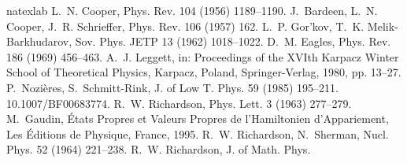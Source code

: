 \documentclass[5p,twocolumn]{elsarticle}
\begin{document}

%
\begin{thebibliography}{16}
\expandafter\ifx\csname natexlab\endcsname\relax\def\natexlab#1{#1}\fi
\providecommand{\bibinfo}[2]{#2}
\ifx\xfnm\relax \def\xfnm[#1]{\unskip,\space#1}\fi
\bibinfo{author}{L.~N. Cooper}, \bibinfo{journal}{Phys. Rev.}
  \bibinfo{volume}{104} (\bibinfo{year}{1956}) \bibinfo{pages}{1189--1190}.
\bibinfo{author}{J.~Bardeen}, \bibinfo{author}{L.~N. Cooper},
  \bibinfo{author}{J.~R. Schrieffer}, \bibinfo{journal}{Phys. Rev.}
  \bibinfo{volume}{106} (\bibinfo{year}{1957}) \bibinfo{pages}{162}.
\bibinfo{author}{L.~P. {Gor'kov}}, \bibinfo{author}{T.~K. Melik-Barkhudarov},
  \bibinfo{journal}{Sov. Phys. JETP} \bibinfo{volume}{13}
  (\bibinfo{year}{1962}) \bibinfo{pages}{1018--1022}.
\bibinfo{author}{D.~M. Eagles}, \bibinfo{journal}{Phys. Rev.}
  \bibinfo{volume}{186} (\bibinfo{year}{1969}) \bibinfo{pages}{456--463}.
\bibinfo{author}{A.~J. Leggett}, in: \bibinfo{booktitle}{Proceedings of the
  XVIth Karpacz Winter School of Theoretical Physics, Karpacz, Poland},
  \bibinfo{publisher}{Springer-Verlag}, \bibinfo{year}{1980}, pp.
  \bibinfo{pages}{13--27}.
\bibinfo{author}{P.~Nozi\`{e}res}, \bibinfo{author}{S.~Schmitt-Rink},
  \bibinfo{journal}{J. of Low T. Phys.} \bibinfo{volume}{59}
  (\bibinfo{year}{1985}) \bibinfo{pages}{195--211}.
  \bibinfo{note}{10.1007/BF00683774}.
\bibinfo{author}{R.~W. Richardson}, \bibinfo{journal}{Phys. Lett.}
  \bibinfo{volume}{3} (\bibinfo{year}{1963}) \bibinfo{pages}{277--279}.
\bibinfo{author}{M.~Gaudin}, \bibinfo{title}{{\'{E}tats Propres et Valeurs
  Propres de l'Hamiltonien d'Appariement}}, \bibinfo{publisher}{Les
  \'{E}ditions de Physique, France}, \bibinfo{year}{1995}.
\bibinfo{author}{R.~W. Richardson}, \bibinfo{author}{N.~Sherman},
  \bibinfo{journal}{Nucl. Phys.} \bibinfo{volume}{52} (\bibinfo{year}{1964})
  \bibinfo{pages}{221--238}.
\bibinfo{author}{R.~W. Richardson}, \bibinfo{journal}{J. of Math. Phys.}

\end{thebibliography}
\end{document}
